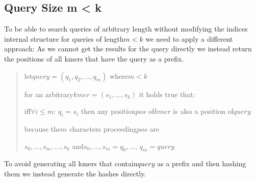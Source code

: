 \subsection{\label{section m < k}Query Size m < k}

To be able to search queries of arbitrary length without modifying
the indices internal structure for queries of length$m<k$ we need
to apply a different approach: As we cannot get the results for the
query directly we instead return the positions of all kmers that have
the query as a prefix.
\begin{verse}
let$query=(q_{1},q_{2},...,q_{m})$ where$m<k$

for an arbitrary$kmer=(s_{1},...,s_{k})$ it holds true that:

iff$\forall i\leq m:\:q_{i}=s_{i}$ then any position$pos$ of$kmer$
is also a position of$query$

because the$m$ characters proceeding$pos$ are

$s_{0},...,s_{m},...,s_{k}$ and$s_{0},...,s_{m}=q_{0},...,\,q_{m}=query$
\end{verse}
\noindent To avoid generating all kmers that contain$query$ as a
prefix and then hashing them we instead generate the hashes directly.
